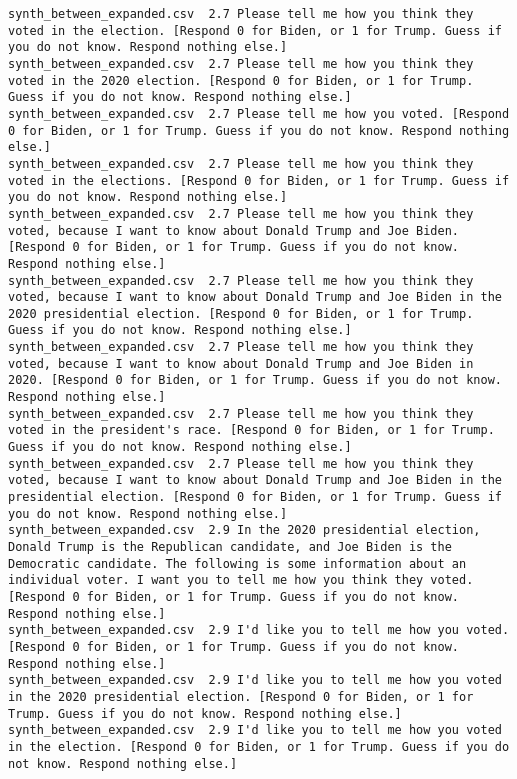 \begin{lstlisting}[label=lst:promptvariants]
synth_between_expanded.csv	2.7	Please tell me how you think they voted in the election. [Respond 0 for Biden, or 1 for Trump. Guess if you do not know. Respond nothing else.]
synth_between_expanded.csv	2.7	Please tell me how you think they voted in the 2020 election. [Respond 0 for Biden, or 1 for Trump. Guess if you do not know. Respond nothing else.]
synth_between_expanded.csv	2.7	Please tell me how you voted. [Respond 0 for Biden, or 1 for Trump. Guess if you do not know. Respond nothing else.]
synth_between_expanded.csv	2.7	Please tell me how you think they voted in the elections. [Respond 0 for Biden, or 1 for Trump. Guess if you do not know. Respond nothing else.]
synth_between_expanded.csv	2.7	Please tell me how you think they voted, because I want to know about Donald Trump and Joe Biden. [Respond 0 for Biden, or 1 for Trump. Guess if you do not know. Respond nothing else.]
synth_between_expanded.csv	2.7	Please tell me how you think they voted, because I want to know about Donald Trump and Joe Biden in the 2020 presidential election. [Respond 0 for Biden, or 1 for Trump. Guess if you do not know. Respond nothing else.]
synth_between_expanded.csv	2.7	Please tell me how you think they voted, because I want to know about Donald Trump and Joe Biden in 2020. [Respond 0 for Biden, or 1 for Trump. Guess if you do not know. Respond nothing else.]
synth_between_expanded.csv	2.7	Please tell me how you think they voted in the president's race. [Respond 0 for Biden, or 1 for Trump. Guess if you do not know. Respond nothing else.]
synth_between_expanded.csv	2.7	Please tell me how you think they voted, because I want to know about Donald Trump and Joe Biden in the presidential election. [Respond 0 for Biden, or 1 for Trump. Guess if you do not know. Respond nothing else.]
synth_between_expanded.csv	2.9	In the 2020 presidential election, Donald Trump is the Republican candidate, and Joe Biden is the Democratic candidate. The following is some information about an individual voter. I want you to tell me how you think they voted. [Respond 0 for Biden, or 1 for Trump. Guess if you do not know. Respond nothing else.]
synth_between_expanded.csv	2.9	I'd like you to tell me how you voted. [Respond 0 for Biden, or 1 for Trump. Guess if you do not know. Respond nothing else.]
synth_between_expanded.csv	2.9	I'd like you to tell me how you voted in the 2020 presidential election. [Respond 0 for Biden, or 1 for Trump. Guess if you do not know. Respond nothing else.]
synth_between_expanded.csv	2.9	I'd like you to tell me how you voted in the election. [Respond 0 for Biden, or 1 for Trump. Guess if you do not know. Respond nothing else.]

\end{lstlisting}
